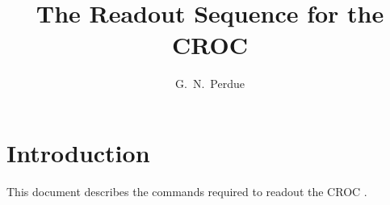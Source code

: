 




\linenumbers

\title{The Readout Sequence for the \minerva CROC}

\author[1]{G.~N.~Perdue}
\affil[1]{\Rochester}

\maketitle


\section{Introduction}
\label{sec:introduction}

This document describes the commands required to readout the \minerva CROC \cite{refcroc}.





